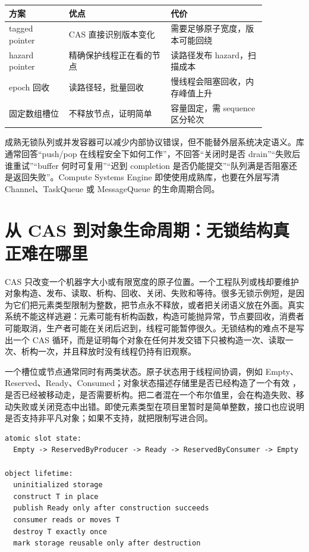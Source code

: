 \begin{center}
\begin{tabular}{p{0.20\linewidth}p{0.34\linewidth}p{0.32\linewidth}}
\toprule
方案 & 优点 & 代价 \\
\midrule
tagged pointer & CAS 直接识别版本变化 & 需要足够原子宽度，版本可能回绕 \\
hazard pointer & 精确保护线程正在看的节点 & 读路径发布 hazard，扫描成本 \\
epoch 回收 & 读路径轻，批量回收 & 慢线程会阻塞回收，内存峰值上升 \\
固定数组槽位 & 不释放节点，证明简单 & 容量固定，需 sequence 区分轮次 \\
\bottomrule
\end{tabular}
\end{center}
成熟无锁队列或并发容器可以减少内部协议错误，但不能替外层系统决定语义。库通常回答“push/pop 在线程安全下如何工作”，不回答“关闭时是否 drain”“失败后谁重试”“buffer 何时可复用”“迟到 completion 是否仍能提交”“队列满是否阻塞还是返回失败”。Compute Systems Engine 即使使用成熟库，也要在外层写清 Channel、TaskQueue 或 MessageQueue 的生命周期合同。

\section{从 CAS 到对象生命周期：无锁结构真正难在哪里}

CAS 只改变一个机器字大小或有限宽度的原子位置。一个工程队列或栈却要维护对象构造、发布、读取、析构、回收、关闭、失败和等待。很多无锁示例短，是因为它们把元素类型限制为整数，把节点永不释放，或者把关闭语义放在外面。真实系统不能这样逃避：元素可能有析构函数，构造可能抛异常，节点要回收，消费者可能取消，生产者可能在关闭后迟到，线程可能暂停很久。无锁结构的难点不是写出一个 CAS 循环，而是证明每个对象在任何并发交错下只被构造一次、读取一次、析构一次，并且释放时没有线程仍持有旧观察。

一个槽位或节点通常同时有两类状态。原子状态用于线程间协调，例如 Empty、Reserved、Ready、Consumed；对象状态描述存储里是否已经构造了一个有效 ，是否已经被移动走，是否需要析构。把二者混在一个布尔值里，会在构造失败、移动失败或关闭竞态中出错。即使元素类型在项目里暂时是简单整数，接口也应说明是否支持非平凡对象；如果不支持，就把限制写进合同。

\begin{lstlisting}[numbers=none,caption={槽位协议要同时维护两张账本}]
atomic slot state:
  Empty -> ReservedByProducer -> Ready -> ReservedByConsumer -> Empty

object lifetime:
  uninitialized storage
  construct T in place
  publish Ready only after construction succeeds
  consumer reads or moves T
  destroy T exactly once
  mark storage reusable only after destruction
\end{lstlisting}


